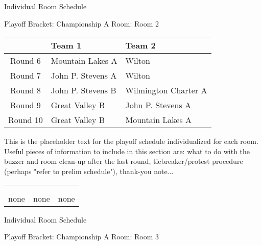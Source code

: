 \documentclass{article}%
\begin{document}
\newpage%
\begin{center}%
\begin{Huge}%
Individual Room Schedule%
\end{Huge}%
\vspace*{16pt}%
\linebreak%
\begin{Large}%
Playoff Bracket: Championship A \hfill Room: Room 2%
\end{Large}%
\end{center}%
%
\begin{tabularx}{\textwidth}{|c|Y|Y|}%
\hline%
&Team 1&Team 2\\%
\hline%
Round 6&Mountain Lakes A&Wilton\\%
Round 7&John P. Stevens A&Wilton\\%
Round 8&John P. Stevens B&Wilmington Charter A\\%
Round 9&Great Valley B&John P. Stevens A\\%
Round 10&Great Valley B&Mountain Lakes A\\%
\hline%
\end{tabularx}%
\vspace*{16pt}%
\linebreak%
This is the placeholder text for the playoff schedule individualized for each room. Useful pieces of information to include in this section are: what to do with the buzzer and room clean{-}up after the last round, tiebreaker/protest procedure (perhaps "refer to prelim schedule"), thank{-}you note...%
\vspace*{30pt}%
\newline%
%
\begin{tabularx}{\textwidth}{YYY}%
  &  &  \\%
\\%
none&none&none\\%
\end{tabularx}%
\newpage%
\begin{center}%
\begin{Huge}%
Individual Room Schedule%
\end{Huge}%
\vspace*{16pt}%
\linebreak%
\begin{Large}%
Playoff Bracket: Championship A \hfill Room: Room 3%
\end{Large}%
\end{center}%
\end{document}
